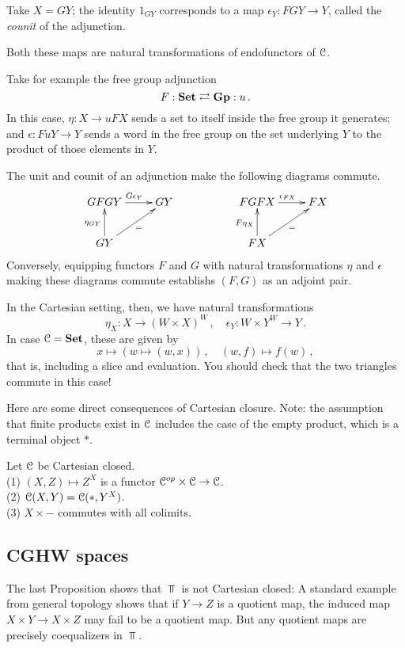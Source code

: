 Take $X=GY$; the identity $1_{GY}$ corresponds to a map $\epsilon_Y:FGY\to Y$,
called the {\em counit} of the adjunction.

Both these maps are natural transformations of endofunctors of $\mathcal C$. 

\begin{example} Take for example the free group adjunction
\[
F:\mathbf{Set}\rightleftarrows\mathbf{Gp}:u\,.
\]
In this case, $\eta:X\to uFX$ sends a set to itself inside the free group
it generates; and $\epsilon:FuY\to Y$ sends a word in the free group on
the set underlying $Y$ to the product of those elements in $Y$. 
\end{example}

\begin{lemma} The unit and counit of an adjunction make the following
diagrams commute.
\[
\xymatrix{
GFGY \ar[r]^{G\epsilon_Y} & GY & & FGFX \ar[r]^{\epsilon_{FX}} & FX \\
GY \ar[u]^{\eta_{GY}} \ar[ur]_= & & & FX \ar[u]^{F\eta_X} \ar[ur]_=
}
\]
Conversely, equipping functors $F$ and $G$ with natural 
transformations $\eta$ and $\epsilon$ making these diagrams commute 
establishs $(F,G)$ as an adjoint pair.
\end{lemma}

In the Cartesian setting, then, we have natural transformations
\[
\eta_X:X\to(W\times X)^W\,,\quad \epsilon_Y:W\times Y^W\to Y\,.
\]
In case $\mathcal C=\mathbf{Set}$, these are given by
\[
x\mapsto(w\mapsto(w,x))\,,\quad(w,f)\mapsto f(w)\,,
\]
that is, including a slice and evaluation. You should check that the 
two triangles commute in this case! 

Here are some direct consequences of Cartesian closure. Note: the assumption
that finite products exist in $\mathcal C$ includes the case of the empty product,
which is a terminal object $*$.

\begin{prop}
Let $\mathcal C$ be Cartesian closed. \\
(1) $(X,Z)\mapsto Z^X$ is a functor $\mathcal C^{op}\times\mathcal C\to\mathcal C$.\\
(2) $\mathcal C(X,Y)=\mathcal C(*,Y^X)$.\\
(3) $X\times-$ commutes with all colimits.
\end{prop}

\subsection{CGHW spaces}\label{CGWHspaces}

The last Proposition shows that $\Top$ is not Cartesian closed:
A standard example from general topology shows that if $Y\to Z$ is a
quotient map, the induced map $X\times Y\to X\times Z$ may fail to be
a quotient map. But any quotient maps are precisely coequalizers in $\Top$. 

